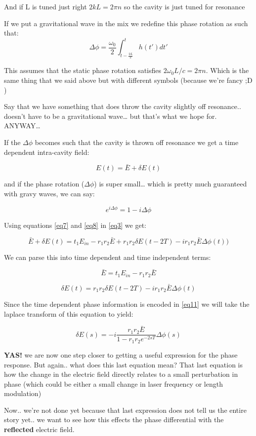 \documentclass[11pt]{article}
\begin{document}
And if L is tuned just right \(2kL = 2 \pi n\) so the cavity is just
tuned for resonance

If we put a gravitational wave in the mix we redefine this phase
rotation as such that:
\[\Delta \phi =  \frac{\omega_0}{2} \int_{t-\frac{2L}{c}}^{t} h(t')dt'  \label{eq6}\tag{6}\]

This assumes that the static phase rotation satisfies
\(2\omega_0L/c = 2 \pi n\). Which is the same thing that we said above
but with different symbols (because we're fancy ;D )

Say that we have something that does throw the cavity slightly off
resonance.. doesn't have to be a gravitational wave\ldots{} but that's
what we hope for. ANYWAY\ldots{}

If the \(\Delta \phi\) becomes such that the cavity is thrown off
resonance we get a time dependent intra-cavity field:

\[ E(t) = \bar{E} + \delta E(t) \label{eq7}\tag{7} \]

and if the phase rotation (\(\Delta \phi\)) is super small\ldots{} which
is pretty much guaranteed with gravy waves, we can say:

\[ e^{i\Delta \phi} = 1- i \Delta \phi \label{eq8}\tag{8}\]

Using equations \ref{eq7} and \ref{eq8} in \ref{eq3} we get:

\[ \bar{E} + \delta E(t) = t_1 E_{in} -r_1r_2\bar{E} + r_1r_2 \delta E(t-2T) - ir_1r_2\bar{E}\Delta \phi(t)) \label{eq9}\tag{9} \]

We can parse this into time dependent and time independent terms:

\[ \bar{E} = t_1 E_{in} -r_1r_2\bar{E} \label{eq10}\tag{10} \]

\[ \delta E(t) = r_1r_2 \delta E(t-2T) - ir_1r_2\bar{E}\Delta \phi(t) \label{eq11}\tag{11} \]

Since the time dependent phase information is encoded in \ref{eq11} we
will take the laplace transform of this equation to yield:

\[\delta E(s) = -i \frac{r_1r_2 \bar{E}}{1-r_1r_2e^{-2sT}} \Delta \phi(s)\]

\textbf{YAS!} we are now one step closer to getting a useful expression
for the phase response. But again.. what does this last equation mean?
That last equation is how the change in the electric field directly
relates to a small perturbation in phase (which could be either a small
change in laser frequency or length modulation)

Now.. we're not done yet because that last expression does not tell us
the entire story yet.. we want to see how this effects the phase
differential with the \textbf{reflected} electric field.
\end{document}
